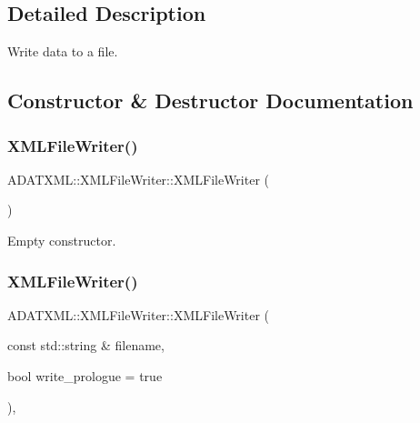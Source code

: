 \subsection{Detailed Description}
Write data to a file. 

\subsection{Constructor \& Destructor Documentation}
\mbox{\label{classADATXML_1_1XMLFileWriter_a40db177b66a4598583a3a08e19c1e927}} 
\subsubsection{\texorpdfstring{XMLFileWriter()}{XMLFileWriter()}\hspace{0.1cm}{\footnotesize\ttfamily [1/6]}}
{\footnotesize\ttfamily A\+D\+A\+T\+X\+M\+L\+::\+X\+M\+L\+File\+Writer\+::\+X\+M\+L\+File\+Writer (\begin{DoxyParamCaption}{ }\end{DoxyParamCaption})}



Empty constructor. 

\mbox{\label{classADATXML_1_1XMLFileWriter_a83cf749ff969a30d3de1895f271b238a}} 
\subsubsection{\texorpdfstring{XMLFileWriter()}{XMLFileWriter()}\hspace{0.1cm}{\footnotesize\ttfamily [2/6]}}
{\footnotesize\ttfamily A\+D\+A\+T\+X\+M\+L\+::\+X\+M\+L\+File\+Writer\+::\+X\+M\+L\+File\+Writer (\begin{DoxyParamCaption}\item[{const std\+::string \&}]{filename,  }\item[{bool}]{write\+\_\+prologue = {\ttfamily true} }\end{DoxyParamCaption})\hspace{0.3cm}{\ttfamily [inline]}, {\ttfamily [explicit]}}



